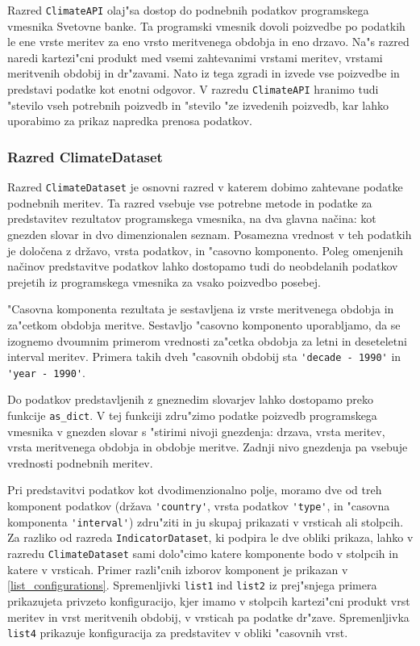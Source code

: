 Razred \verb|ClimateAPI| olaj"sa dostop do podnebnih podatkov programskega
vmesnika Svetovne banke. Ta programski vmesnik dovoli poizvedbe po podatkih le 
ene vrste meritev za eno vrsto meritvenega obdobja in eno drzavo. Na"s razred 
naredi kartezi"cni produkt med vsemi zahtevanimi vrstami meritev, vrstami
meritvenih obdobij in dr"zavami. Nato iz tega zgradi in izvede vse poizvedbe 
in predstavi podatke kot enotni odgovor. V razredu \verb|ClimateAPI| hranimo 
tudi "stevilo vseh potrebnih poizvedb in "stevilo "ze izvedenih poizvedb, kar 
lahko uporabimo za prikaz napredka prenosa podatkov.



\subsubsection{Razred ClimateDataset}

Razred \verb|ClimateDataset| je osnovni razred v katerem dobimo zahtevane 
podatke podnebnih meritev. Ta razred vsebuje vse potrebne metode in podatke za 
predstavitev rezultatov programskega vmesnika, na dva glavna načina: kot
gnezden slovar in dvo dimenzionalen seznam. Posamezna vrednost v teh podatkih
je določena z državo, vrsta podatkov, in "casovno komponento. Poleg omenjenih
načinov predstavitve podatkov lahko dostopamo tudi do neobdelanih podatkov 
prejetih iz programskega vmesnika za vsako poizvedbo posebej.

"Casovna komponenta rezultata je sestavljena iz vrste meritvenega obdobja in 
za"cetkom obdobja meritve. Sestavljo "casovno komponento uporabljamo, da se 
izognemo dvoumnim primerom vrednosti za"cetka obdobja za letni in deseteletni 
interval meritev. Primera takih dveh "casovnih obdobij sta 
\verb|'decade - 1990'| in \verb|'year - 1990'|.


Do podatkov predstavljenih z gneznedim slovarjev lahko dostopamo preko funkcije
\verb|as_dict|. V tej funkciji zdru"zimo podatke poizvedb programskega
vmesnika v gnezden slovar s "stirimi nivoji gnezdenja: drzava, vrsta meritev,
vrsta meritvenega obdobja in obdobje meritve. Zadnji nivo gnezdenja pa vsebuje
vrednosti podnebnih meritev.

Pri predstavitvi podatkov kot dvodimenzionalno polje, moramo dve od treh
komponent podatkov (država \verb|'country'|, vrsta podatkov \verb|'type'|, 
in "casovna komponenta \verb|'interval'|)
zdru"ziti in ju skupaj prikazati v vrsticah ali stolpcih. Za razliko od razreda
\verb|IndicatorDataset|, ki podpira le dve obliki prikaza, lahko v razredu
\verb|ClimateDataset| sami dolo"cimo katere komponente bodo v stolpcih in
katere v vrsticah. Primer razli"cnih izborov komponent je prikazan v
\ref{list_configurations}. Spremenljivki \verb|list1| ind \verb|list2| iz
prej"snjega primera prikazujeta privzeto konfiguracijo, kjer imamo v stolpcih
kartezi"cni produkt vrst meritev in vrst meritvenih obdobij, v vrsticah pa
podatke dr"zave. Spremenljivka \verb|list4| prikazuje konfiguracija za
predstavitev v obliki "casovnih vrst.


